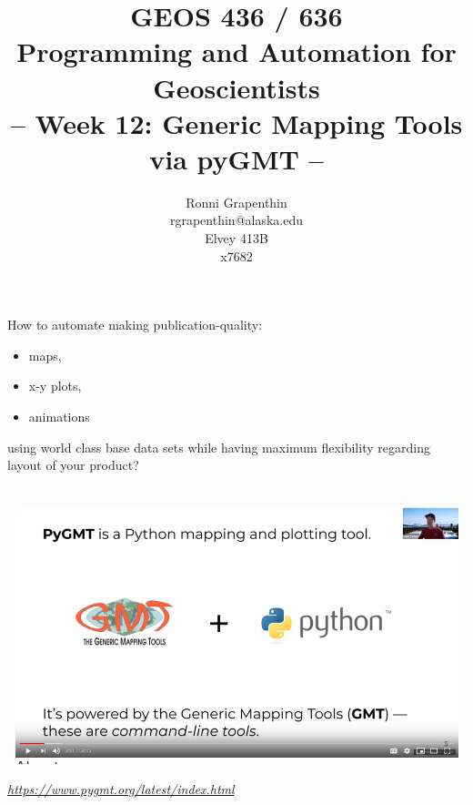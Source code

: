 \documentclass[unknownkeysallowed]{beamer}
\title[PAG]%
{GEOS 436 / 636\\
Programming and Automation for Geoscientists\\[20pt]
-- Week 12: Generic Mapping Tools via pyGMT --
}
\author[Grapenthin]%
{Ronni Grapenthin\\
rgrapenthin@alaska.edu\\
Elvey 413B\\
x7682}
\institute[UAF] %
{}
\date[]{}
\begin{document}
\lstset{numbers=left, numberstyle=\tiny, stepnumber=2, basicstyle=\ttfamily, numbersep=5pt, xleftmargin=10pt}


	\begin{frame}
	\begin{center}
		\titlepage
	\end{center}
	\end{frame}


\begin{frame}
\frametitle{}
	How to automate making publication-quality:

	\begin{itemize}
		\item maps,
		\item x-y plots, 
		\item animations 
	\end{itemize}

	using world class base data sets while having maximum flexibility regarding layout of your product?
\end{frame}


\begin{frame}
\frametitle{}
	\begin{center}
		\includegraphics[width=\textwidth]{../figures/pygmt_header.png}	
	\end{center}
	\begin{flushright}
	\tiny{\emph{\url{https://www.pygmt.org/latest/index.html}}}
	\end{flushright}	
\end{frame}
\end{document}
